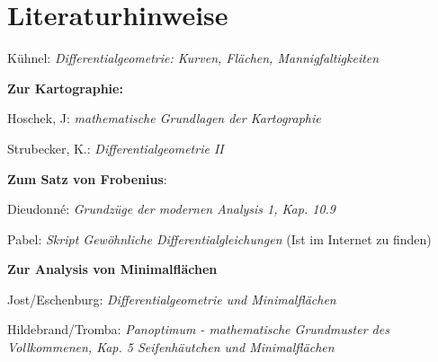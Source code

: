 \chapter*{Literaturhinweise}

Kühnel: \textit{Differentialgeometrie: Kurven, Flächen, Mannigfaltigkeiten}

\textbf{Zur Kartographie:}\par
Hoschek, J: \textit{mathematische Grundlagen der Kartographie} \par
Strubecker, K.: \textit{Differentialgeometrie II}

\textbf{Zum Satz von \textsc Frobenius}: \par
Dieudonné: \textit{Grundzüge der modernen Analysis 1, Kap. 10.9} \par
Pabel: \textit{Skript Gewöhnliche Differentialgleichungen} (Ist im Internet zu finden)

\textbf{Zur Analysis von Minimalflächen} \par
Jost/Eschenburg: \textit{Differentialgeometrie und Minimalflächen}\par
Hildebrand/Tromba: \textit{Panoptimum - mathematische Grundmuster des Vollkommenen, Kap. 5 Seifenhäutchen und Minimalflächen}